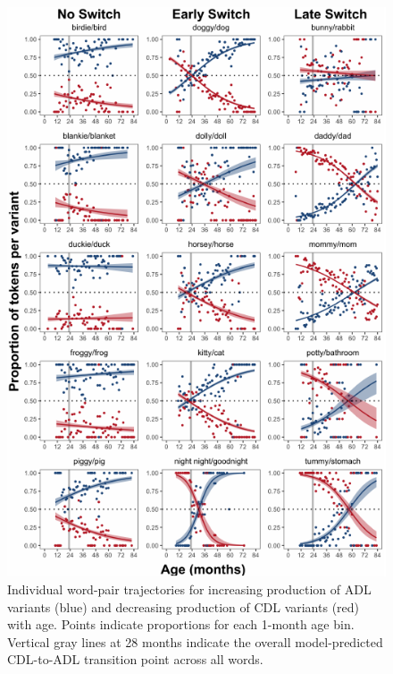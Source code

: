 \documentclass[10pt, letterpaper]{article}
\newenvironment{CodeChunk}{}{}
\begin{document}
\begin{CodeChunk}
\begin{figure}[!ht]

{\centering \includegraphics{figs/shift-timing-bypair-fig-1} 

}

\caption[Individual word-pair trajectories for increasing production of ADL variants (blue) and decreasing production of CDL variants (red) with age]{Individual word-pair trajectories for increasing production of ADL variants (blue) and decreasing production of CDL variants (red) with age. Points indicate proportions for each 1-month age bin. Vertical gray lines at 28 months indicate the overall model-predicted CDL-to-ADL transition point across all words.}\label{fig:shift-timing-bypair-fig}
\end{figure}
\end{CodeChunk}
\end{document}
